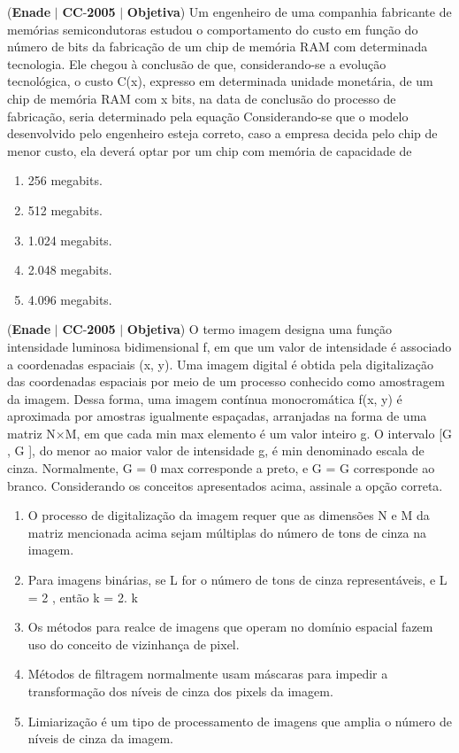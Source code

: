 \documentclass{exam}
\begin{document}
\begin{questions}
\question (\textbf{Enade} $|$ \textbf{CC}-\textbf{2005} $|$ \textbf{Objetiva})
Um engenheiro de uma companhia fabricante de
memórias semicondutoras estudou o comportamento
do custo em função do número de bits da fabricação de
um chip de memória RAM com determinada
tecnologia. Ele chegou à conclusão de que,
considerando-se a evolução tecnológica, o custo C(x),
expresso em determinada unidade monetária, de um
chip de memória RAM com x bits, na data de conclusão
do processo de fabricação, seria determinado pela
equação
Considerando-se que o modelo desenvolvido pelo engenheiro
esteja correto, caso a empresa decida pelo chip de menor
custo, ela deverá optar por um chip com memória de
capacidade de
	\begin{enumerate}[label=\alph*)]
		\item  256 megabits.
		\item  512 megabits.
		\item  1.024 megabits.
		\item  2.048 megabits.
		\item  4.096 megabits.
	\end{enumerate}

\question (\textbf{Enade} $|$ \textbf{CC}-\textbf{2005} $|$ \textbf{Objetiva})
O termo imagem designa uma função
intensidade luminosa bidimensional f, em que um valor
de intensidade é associado a coordenadas espaciais
(x, y). Uma imagem digital é obtida pela digitalização
das coordenadas espaciais por meio de um processo
conhecido como amostragem da imagem. Dessa
forma, uma imagem contínua monocromática f(x, y) é
aproximada por amostras igualmente espaçadas,
arranjadas na forma de uma matriz N×M, em que cada
min max
elemento é um valor inteiro g. O intervalo [G , G ],
do menor ao maior valor de intensidade g, é
min
denominado escala de cinza. Normalmente, G = 0
max
corresponde a preto, e G = G corresponde ao
branco.
Considerando os conceitos apresentados acima, assinale a
opção correta.
	\begin{enumerate}[label=\alph*)]
		\item  O processo de digitalização da imagem requer que as
dimensões N e M da matriz mencionada acima sejam
múltiplas do número de tons de cinza na imagem.
		\item  Para imagens binárias, se L for o número de tons de cinza
representáveis, e L = 2 , então k = 2.
k
		\item  Os métodos para realce de imagens que operam no
domínio espacial fazem uso do conceito de vizinhança de
pixel.
		\item  Métodos de filtragem normalmente usam máscaras para
impedir a transformação dos níveis de cinza dos pixels da
imagem.
		\item  Limiarização é um tipo de processamento de imagens que
amplia o número de níveis de cinza da imagem.
	\end{enumerate}


\end{questions}
\end{document}
